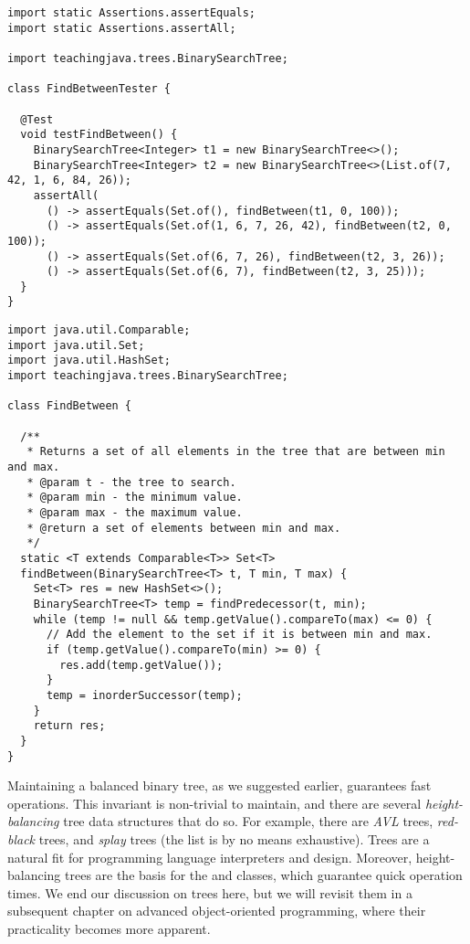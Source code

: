 \begin{lstlisting}[language=MyJava]
import static Assertions.assertEquals;
import static Assertions.assertAll;

import teachingjava.trees.BinarySearchTree;

class FindBetweenTester {

  @Test
  void testFindBetween() {
    BinarySearchTree<Integer> t1 = new BinarySearchTree<>();
    BinarySearchTree<Integer> t2 = new BinarySearchTree<>(List.of(7, 42, 1, 6, 84, 26));
    assertAll(
      () -> assertEquals(Set.of(), findBetween(t1, 0, 100));
      () -> assertEquals(Set.of(1, 6, 7, 26, 42), findBetween(t2, 0, 100));
      () -> assertEquals(Set.of(6, 7, 26), findBetween(t2, 3, 26));
      () -> assertEquals(Set.of(6, 7), findBetween(t2, 3, 25)));
  }
}
\end{lstlisting}

\enlargethispage{-9\baselineskip}
\begin{lstlisting}[language=MyJava]
import java.util.Comparable;
import java.util.Set;
import java.util.HashSet;
import teachingjava.trees.BinarySearchTree;

class FindBetween {

  /**
   * Returns a set of all elements in the tree that are between min and max.
   * @param t - the tree to search.
   * @param min - the minimum value.
   * @param max - the maximum value.
   * @return a set of elements between min and max.
   */
  static <T extends Comparable<T>> Set<T> 
  findBetween(BinarySearchTree<T> t, T min, T max) {
    Set<T> res = new HashSet<>();
    BinarySearchTree<T> temp = findPredecessor(t, min);
    while (temp != null && temp.getValue().compareTo(max) <= 0) {
      // Add the element to the set if it is between min and max.
      if (temp.getValue().compareTo(min) >= 0) {
        res.add(temp.getValue());
      }
      temp = inorderSuccessor(temp);
    }
    return res;
  }
}
\end{lstlisting}

Maintaining a balanced binary tree, as we suggested earlier, guarantees fast operations. 
This invariant is non-trivial to maintain, and there are several \emph{height-balancing} tree data structures that do so. 
For example, there are \emph{AVL} trees, \emph{red-black} trees, and \emph{splay} trees (the list is by no means exhaustive). 
Trees are a natural fit for programming language interpreters and design. Moreover, height-balancing trees are the basis for the  and  classes, which guarantee quick operation times.
We end our discussion on trees here, but we will revisit them in a subsequent chapter on advanced object-oriented programming, where their practicality becomes more apparent.